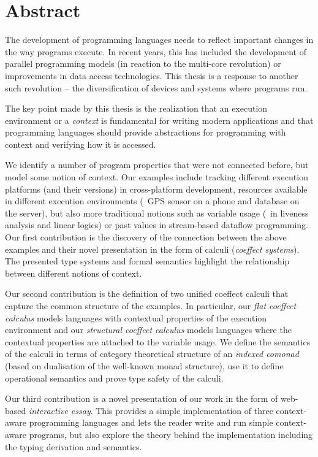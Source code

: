
\begingroup
\let\clearpage\relax
\let\cleardoublepage\relax
\let\cleardoublepage\relax

\chapter*{Abstract} %
The development of programming languages needs to reflect important changes in the way
programs execute. In recent years, this has included the development of parallel programming
models (in reaction to the multi-core revolution) or improvements in data access technologies.
This thesis is a response to another such revolution -- the diversification of devices and
systems where programs run.

The key point made by this thesis is the realization that an execution environment or
a \emph{context} is fundamental for writing modern applications and that programming
languages should provide abstractions for programming with context and verifying how
it is accessed.

We identify a number of program properties that were not connected before, but model some notion
of context. Our examples include tracking different execution platforms (and their versions)
in cross-platform development, resources available in different execution environments (\eg~GPS
sensor on a phone and database on the server), but also more traditional notions such as
variable usage (\eg~in liveness analysis and linear logics) or past values in
stream-based dataflow programming. Our first contribution is the discovery of the connection
between the above examples and their novel presentation in the form of calculi (\emph{coeffect systems}).
The presented type systems and formal semantics highlight the relationship between different
notions of context.

Our second contribution is the definition of two unified coeffect calculi that capture the common
structure of the examples. In particular, our \emph{flat coeffect calculus} models languages
with contextual properties of the execution environment and our \emph{structural coeffect
calculus} models languages where the contextual properties are attached to the variable usage.
We define the semantics of the calculi in terms of category theoretical structure of an
\emph{indexed comonad} (based on dualisation of the well-known monad structure), use it
to define operational semantics and prove type safety of the calculi.

Our third contribution is a novel presentation of our work in the form of web-based
\emph{interactive essay}. This provides a simple implementation of three context-aware programming
languages and lets the reader write and run simple context-aware programs, but also explore the
theory behind the implementation including the typing derivation and semantics.


\endgroup

\vfill
